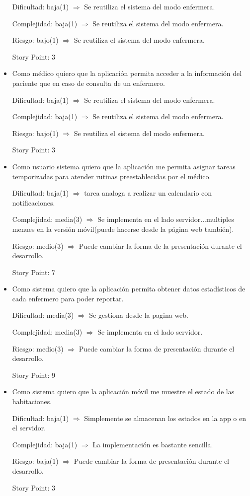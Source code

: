 \documentclass[
11pt, %
]{charter}
\begin{document}
\begin{itemize}
Dificultad: baja(1) $\Rightarrow$ Se reutiliza el sistema del modo enfermera.

Complejidad: baja(1) $\Rightarrow$ Se reutiliza el sistema del modo enfermera.

Riesgo: bajo(1) $\Rightarrow$ Se reutiliza el sistema del modo enfermera.

Story Point: 3


\item Como médico quiero que la aplicación permita acceder a la información del paciente que en caso de consulta de un enfermero.

Dificultad: baja(1) $\Rightarrow$ Se reutiliza el sistema del modo enfermera.

Complejidad: baja(1) $\Rightarrow$ Se reutiliza el sistema del modo enfermera.

Riesgo: bajo(1) $\Rightarrow$ Se reutiliza el sistema del modo enfermera.


Story Point: 3


\item Como usuario sistema quiero que la aplicación me permita asignar tareas temporizadas para atender rutinas preestablecidas por el médico.

Dificultad: baja(1) $\Rightarrow$  tarea analoga a realizar un calendario con notificaciones. 

Complejidad: media(3) $\Rightarrow$ Se implementa en el lado servidor...multiples menues en la versión móvil(puede hacerse desde la página web también).

Riesgo: medio(3) $\Rightarrow$ Puede cambiar la forma de la presentación durante el desarrollo.


Story Point: 7


\item Como sistema quiero que la aplicación permita obtener datos estadísticos de cada enfermero para poder reportar.


Dificultad: media(3) $\Rightarrow$ Se gestiona desde la pagina web.

Complejidad: media(3) $\Rightarrow$ Se implementa en el lado servidor.

Riesgo: medio(3) $\Rightarrow$ Puede cambiar la forma de presentación durante el desarrollo.


Story Point: 9

\item Como sistema quiero que la aplicación móvil me muestre el estado de las habitaciones.

Dificultad: baja(1) $\Rightarrow$ Simplemente se almacenan los estados en la app o en el servidor.

Complejidad: baja(1) $\Rightarrow$ La implementación es bastante sencilla.

Riesgo: baja(1) $\Rightarrow$ Puede cambiar la forma de presentación durante el desarrollo.

Story Point: 3


\end{itemize}
\end{document}
